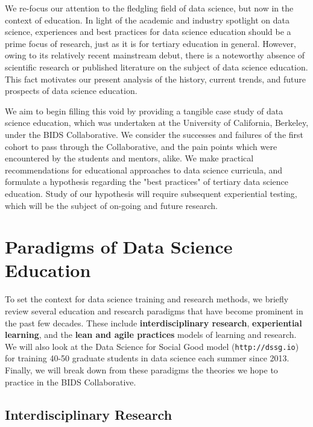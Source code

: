 \documentclass{sig-alternate}
\begin{document}
We re-focus our attention to the fledgling field of data science, but now in the context of education.  In light of the academic and industry spotlight on data science, experiences  and best practices for data science education should be a prime focus of research, just as it is for tertiary education in general.  However, owing to its relatively recent mainstream debut, there is a noteworthy absence of scientific research or published literature on the subject of data science education.  This fact motivates our present analysis of the history, current trends, and future prospects of data science education.

We aim to begin filling this void by providing a tangible case study of data science education, which was undertaken at the University of California, Berkeley, under the BIDS Collaborative. We consider the successes and failures of the first cohort to pass through the Collaborative, and the pain points which were encountered by the students and mentors, alike.  We make practical recommendations for educational approaches to data science curricula, and formulate a hypothesis regarding the "best practices" of tertiary data science education.  Study of our hypothesis will require subsequent experiential testing, which will be the subject of  on-going and future research.





\section{Paradigms of Data Science \\ Education}

To set the context for data science training and research methods, we briefly review several education and research paradigms that have become prominent in the past few decades. These include \textbf{interdisciplinary research}, \textbf{experiential learning}, and the \textbf{lean and agile practices} models of learning and research. We will also look at the Data Science for Social Good model (\texttt{http://dssg.io}) for training 40-50 graduate students in data science each summer since 2013. Finally, we will break down from these paradigms the theories we hope to practice in the BIDS Collaborative.

\subsection{Interdisciplinary Research}
\end{document}
